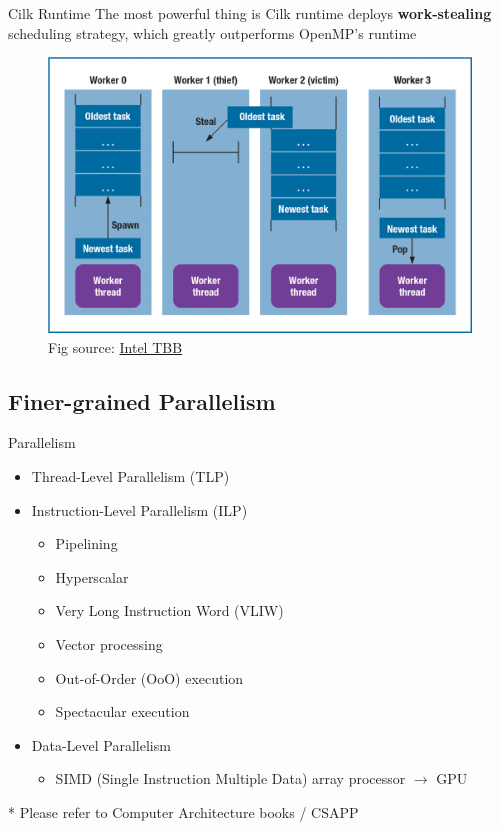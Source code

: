 \documentclass{../TexTemplate/myslide}
\begin{document}
\begin{frame}{Cilk Runtime}
The most powerful thing is Cilk runtime deploys \textbf{work-stealing} scheduling strategy, which greatly outperforms OpenMP's runtime
\begin{figure}[H]
\centering
\includegraphics[width=0.7\linewidth]{fig/tbb.png}
\caption*{\small Fig source: \href{https://csdl-images.computer.org/mags/so/2011/01/figures/mso20110100232.gif}{Intel TBB}}
\end{figure}
\end{frame}

\subsection{Finer-grained Parallelism}
\begin{frame}
\subsectionpage
\end{frame}

\begin{frame}{Parallelism}
\begin{itemize}
	\item Thread-Level Parallelism (TLP)
	\item Instruction-Level Parallelism (ILP)
	\begin{itemize}
		\item Pipelining
		\item Hyperscalar
		\item Very Long Instruction Word (VLIW)
		\item Vector processing
		\item Out-of-Order (OoO) execution
		\item Spectacular execution
	\end{itemize}
	\item Data-Level Parallelism
	\begin{itemize}
		\item SIMD (Single Instruction Multiple Data) array processor $\to$ GPU
	\end{itemize}
\end{itemize}
* Please refer to Computer Architecture books / CSAPP
\end{frame}
\end{document}
